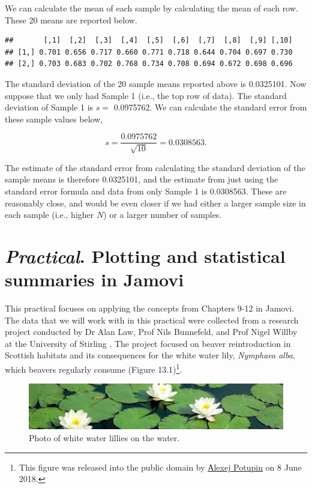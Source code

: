 \documentclass[
]{scrbook}
\begin{document}
We can calculate the mean of each sample by calculating the mean of each row.
These 20 means are reported below.

\begin{verbatim}
##       [,1]  [,2]  [,3]  [,4]  [,5]  [,6]  [,7]  [,8]  [,9] [,10]
## [1,] 0.701 0.656 0.717 0.660 0.771 0.718 0.644 0.704 0.697 0.730
## [2,] 0.703 0.683 0.702 0.768 0.734 0.708 0.694 0.672 0.698 0.696
\end{verbatim}

The standard deviation of the 20 sample means reported above is 0.0325101.
Now suppose that we only had Sample 1 (i.e., the top row of data).
The standard deviation of Sample 1 is \(s =\) 0.0975762.
We can calculate the standard error from these sample values below,

\[s = \frac{0.0975762}{\sqrt{10}} = 0.0308563.\]

The estimate of the standard error from calculating the standard deviation of the sample means is therefore 0.0325101, and the estimate from just using the standard error formula and data from only Sample 1 is 0.0308563.
These are reasonably close, and would be even closer if we had either a larger sample size in each sample (i.e., higher \(N\)) or a larger number of samples.

\hypertarget{Chapter_13}{%
\chapter{\texorpdfstring{\emph{Practical}. Plotting and statistical summaries in Jamovi}{Practical. Plotting and statistical summaries in Jamovi}}\label{Chapter_13}}

This practical focuses on applying the concepts from Chapters 9-12 in Jamovi.
The data that we will work with in this practical were collected from a research project conducted by Dr Alan Law, Prof Nils Bunnefeld, and Prof Nigel Willby at the University of Stirling \citep{Law2014}.
The project focused on beaver reintroduction in Scottish habitats and its consequences for the white water lily, \emph{Nymphaea alba}, which beavers regularly consume (Figure 13.1)\footnote{This figure was released into the public domain by \href{https://commons.wikimedia.org/wiki/File:Nymphaea_alba._Reader.jpg}{Аlexej Potupin} on 8 June 2018.}.

\begin{figure}
\includegraphics[width=1\linewidth]{img/Nymphaea_alba_pads} \caption{Photo of white water lillies on the water.}\label{fig:unnamed-chunk-46}
\end{figure}
\end{document}
